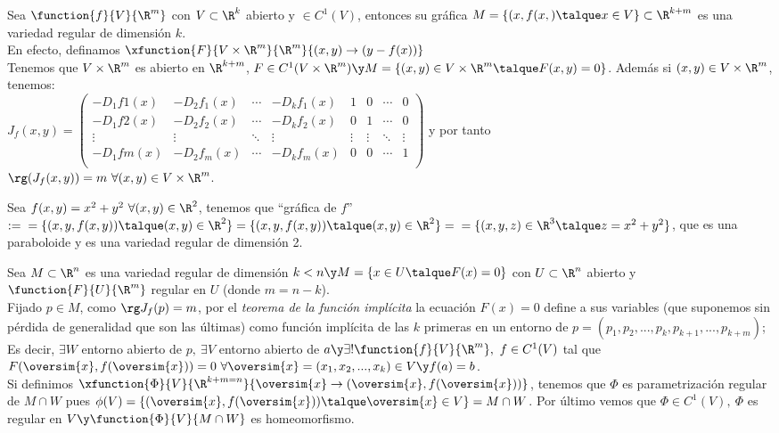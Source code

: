 \begin{ejem} Sea $\function{f}{V}{\R^m}$ con $V\subset\R^k$ abierto y $\in C^1(V)$, entonces su gráfica $M=\{(x,f(x,)\talque x\in V\}\subset\R^{k+m}$ es una variedad regular de dimensión $k$.\\
En efecto, definamos $\xfunction{F}{V\times\R^m}{\R^m}{(x,y)\to(y-f(x))}$\\
Tenemos que $V\times\R^m$ es abierto en $\R^{k+m}$, $F\in C^1(V\times\R^m)\y\\
M=\{(x,y)\in V\times\R^m\talque F(x,y)=0\}$. Además si $(x,y)\in V\times\R^m$, tenemos:\\
$J_f(x,y)=\begin{pmatrix}-D_1f1(x)&-D_2f_1(x)&\cdots&-D_kf_1(x)&1&0&\cdots&0\\
-D_1f2(x)&-D_2f_2(x)&\cdots&-D_kf_2(x)&0&1&\cdots&0\\
\vdots&\vdots&\ddots&\vdots&\vdots&\vdots&\ddots&\vdots\\
-D_1fm(x)&-D_2f_m(x)&\cdots&-D_kf_m(x)&0&0&\cdots&1\\\end{pmatrix}$ y por tanto\\
$\rg(J_f(x,y))=m\ \forall(x,y)\in V\times\R^m$.
\end{ejem}

\begin{ejem} Sea $f(x,y)=x^2+y^2\ \forall (x,y)\in\R^2$, tenemos que ``gráfica de $f$''$:=\\
=\{(x,y,f(x,y))\talque (x,y)\in\R^2\}=\{(x,y,f(x,y))\talque (x,y)\in\R^2\}=\\
=\{(x,y,z)\in\R^3\talque z=x^2+y^2\}$, que es una paraboloide y es una variedad regular de dimensión 2.
\end{ejem}

\begin{ejem} Sea $M\subset\R^n$ es una variedad regular de dimensión $k<n\y M=\{x\in U\talque F(x)=0\}$ con $U\subset\R^n$ abierto y $\function{F}{U}{\R^m}$ regular en $U$ (donde $m=n-k$).\\
Fijado $p\in M$, como $\rg J_f(p)=m$, por el \textit{teorema de la función implícita} la ecuación $F(x)=0$ define a sus variables (que suponemos sin pérdida de generalidad que son las últimas) como función implícita de las $k$ primeras en un entorno de $p=(p_1,p_2,...,p_k,p_{k+1},...,p_{k+m})$; Es decir, $\exists W$ entorno abierto de $p,\ \exists V$ entorno abierto de $a\y\exists! \function{f}{V}{\R^m},\ f\in C^1(V)$ tal que $F(\oversim{x},f(\oversim{x}))=0\ \forall\oversim{x}=(x_1,x_2,...,x_k)\in V\y f(a)=b$.\\
Si definimos $\xfunction{\Phi}{V}{\R^{k+m=n}}{\oversim{x}\to(\oversim{x},f(\oversim{x}))}$, tenemos que $\Phi$ es parametrización regular de $M\cap W$ pues $\phi(V)=\{(\oversim{x},f(\oversim{x}))\talque\oversim{x}\in V\}=M\cap W$. Por último vemos que $\Phi\in C^1(V),\ \Phi$ es regular en $V\y \function{\Phi}{V}{M\cap W}$ es homeomorfismo.
\end{ejem}

